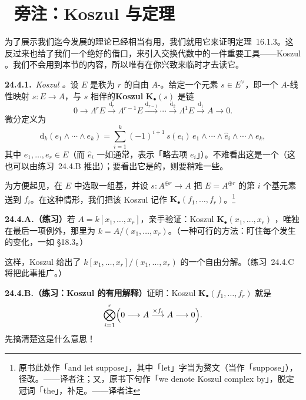 
\section{\extrahard\ 旁注：Koszul \trComplexN{}与\trHilbert{}\trSyzygy{}定理}

为了展示我们迄今发展的理论已经相当有用，我们就用它来证明\trHilbert{}\trSyzygy{}定理~16.1.3。这反过来也给了我们一个绝好的借口，来引入交换代数中的一件重要工具——Koszul \trComplexN。我们不会用到本节的内容，所以唯有在你兴致来临时才去读它。

\textbf{24.4.1.}\ \emph{Koszul \trComplexN。}\quad 设 $E$ 是秩为 $r$ 的自由 $A$-\trModule。给定一个元素 $s\in E^{\vee}$，即一个 $A$-线性映射 $s\colon E\to A$，与 $s$ 相伴的\textbf{Koszul \trComplexN} $\mathbf{K}_\bullet(s)$ 是链\trComplexN
\[
0 \longrightarrow \Lambda^{r}E \overset{\mathrm{d}_r}{\longrightarrow} \Lambda^{r-1}E \overset{\mathrm{d}_{r-1}}{\longrightarrow} \cdots \overset{\mathrm{d}_2}{\longrightarrow} \Lambda^{1}E \overset{\mathrm{d}_1}{\longrightarrow} A \longrightarrow 0.
\]
微分定义为
\[
\mathrm{d}_k(e_1\wedge\cdots\wedge e_k)=\sum_{i=1}^{k}(-1)^{i+1}\,s(e_i)\,e_1\wedge\cdots\wedge\hat{e}_i\wedge\cdots\wedge e_k,
\]
其中 $e_1,\dots,e_r\in E$（而 $\hat{e}_i$ 一如通常，表示「略去项 $e_i$」）。不难看出这是一个\trComplexN（这也可以由\mbox{练习~24.4.B} 推出）；要看出它是\trWellDefined{}的，则要稍难一些。

为方便起见，在 $E$ 中选取一组基，并设 $s\colon A^{\oplus r}\to A$ 把 $E=A^{\oplus r}$ 的第 $i$ 个基元素送到 $f_i$。在这种情形，我们把该 Koszul \trComplexN{}记作 $\mathbf{K}_\bullet(f_1,\dots,f_r)$。\footnote{原书此处作「and let suppose」，其中「let」字当为赘文（当作「suppose」），径改。——译者注；又，原书下句作「we denote Koszul complex by」，脱定冠词「the」，补足。——译者注}

\textbf{24.4.A.（练习）}\quad 若 $A=k[x_1,\dots,x_r]$，亲手验证：Koszul \trComplexN $\mathbf{K}_\bullet(x_1,\dots,x_r)$ \trExact，唯独在最后一项例外，那里\trCohomology{}为 $k=A/(x_1,\dots,x_r)$。（一种可行的方法：盯住每个\trMonomial{}发生的变化，一如 \S18.3。）

这样，Koszul \trComplexN{}给出了 $k[x_1,\dots,x_r]/(x_1,\dots,x_r)$ 的一个自由分解。（\mbox{练习~24.4.C} 将把此事推广。）

\textbf{24.4.B.（练习：Koszul \trComplexN{}的有用解释）}\quad 证明：Koszul \trComplexN $\mathbf{K}_\bullet(f_1,\dots,f_r)$ 就是\trComplexN
\[
\bigotimes_{i=1}^{r}\Bigl(0 \longrightarrow A \overset{\times f_i}{\longrightarrow} A \longrightarrow 0\Bigr).
\]
先搞清楚这是什么意思！

